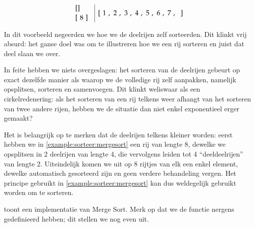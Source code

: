 \begin{example}
\[\begin{array}{c|ll@{\quad}||@{\quad}c|ll}
\begin{array}{l}
      [] \\{}
      [\X8o]
    \end{array}
    &
    [\X1z, \X2z, \X3z, \X4z, \X5z, \X6z, \X7z, \X{}p]
  \end{array}
\]
\newcommand{\MOVE}[2]{\draw[->] (msmerging#1.north) --
                                 ++(0,2pt) --
                                 ($ (msmerging#2.north) + (0,12pt) $) --
                                 (msmerging#2.north);}
\newcommand{\MOVEB}[2]{\draw[->] (msmerging#1.south) --
                                  ++(0,-2pt) -- 
                                  ($ (msmerging#2.south) + (0,-8pt) $) --
                                  (msmerging#2.south);}
\end{example}

In dit voorbeeld negeerden we hoe we de deelrijen zelf sorteerden.
Dit klinkt vrij absurd: het ganse doel was om te illustreren hoe we een rij sorteren en
juist dat deel slaan we over.

In feite hebben we niets overgeslagen: het sorteren van de deelrijen
gebeurt op exact dezelfde manier als waarop we de volledige rij zelf aanpakken, namelijk
opsplitsen, sorteren en samenvoegen. Dit klinkt weliswaar
als een cirkelredenering: als het sorteren van een rij telkens weer
afhangt van het sorteren van twee andere rijen, hebben we de situatie dan niet
enkel exponentieel erger gemaakt?

Het is belangrijk op te merken dat de deelrijen telkens kleiner worden:
eerst hebben we in \cref{example:sorteer:mergesort} een rij van lengte 8, dewelke
we opsplitsen in 2 deelrijen van lengte 4, die vervolgens leiden tot 4 ``deeldeelrijen'' van lengte 2.
Uiteindelijk komen we uit op 8 rijtjes van elk een enkel element, dewelke automatisch
gesorteerd zijn en geen verdere behandeling vergen. Het principe
gebruikt in \cref{example:sorteer:mergesort} kan dus weldegelijk gebruikt worden
om te sorteren.

 toont een implementatie van Merge Sort. Merk op dat we
de functie  nergens gedefinieerd hebben; dit stellen we nog even uit.



